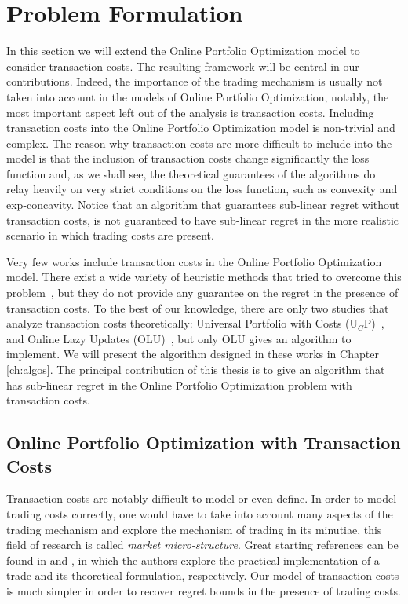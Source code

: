 \chapter{Problem Formulation}\label{ch:transaction_costs}

In this section we will extend the Online Portfolio Optimization model to consider transaction costs. The resulting framework will be central in our contributions.  
Indeed, the importance of the trading mechanism is usually not taken into account in the models of Online Portfolio Optimization, notably, the most important aspect left out of the analysis is transaction costs. Including transaction costs into the Online Portfolio Optimization model is non-trivial and complex. The reason why transaction costs are more difficult to include into the model is that the inclusion of transaction costs change significantly the loss function and, as we shall see, the theoretical guarantees of the algorithms do relay heavily on very strict conditions on the loss function, such as convexity and exp-concavity.
Notice that an algorithm that guarantees sub-linear regret without transaction costs, is not guaranteed to have sub-linear regret in the more realistic scenario in which trading costs are present. 

Very few works include transaction costs in the Online Portfolio Optimization model. 
There exist a wide variety of heuristic methods that tried to overcome this problem~\cite{li2018transaction,yang2018reversion}, but they do not provide any guarantee on the regret in the presence of transaction costs. 
To the best of our knowledge, there are only two studies that analyze transaction costs theoretically: Universal Portfolio with Costs (U$_C$P)~\cite{blum1999universal}, and Online Lazy Updates (OLU)~\cite{das2013online}, but only OLU gives an algorithm to implement. We will present the algorithm designed in these works in Chapter \ref{ch:algos}. The principal contribution of this thesis is to give an algorithm that has sub-linear regret in the Online Portfolio Optimization problem with transaction costs.

\section{Online Portfolio Optimization with Transaction Costs}

Transaction costs are notably difficult to model or even define. In order to model trading costs correctly, one would have to take into account many aspects of the trading mechanism and explore the mechanism of trading in its minutiae, this field of research is called \emph{market micro-structure}. Great starting references can be found in \cite{harris2003trading} and \cite{o1997market}, in which the authors explore the practical implementation of a trade and its theoretical formulation, respectively. Our model of transaction costs is much simpler in order to recover regret bounds in the presence of trading costs. 

